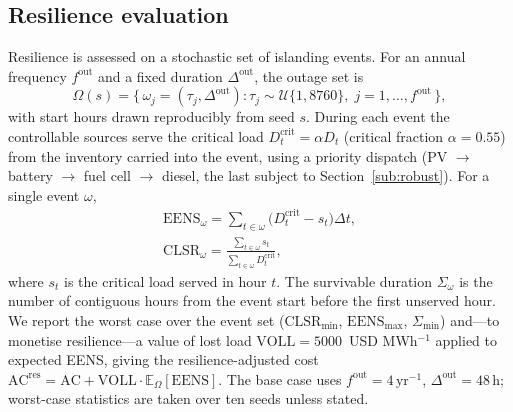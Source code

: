 \documentclass[preprint,12pt]{elsarticle}
\begin{document}
\subsection{Resilience evaluation}
\label{sub:resil}
Resilience is assessed on a stochastic set of islanding events. For an annual
frequency $f^{\mathrm{out}}$ and a fixed duration $\Delta^{\mathrm{out}}$, the
outage set is
\begin{equation}
\label{eq:omega}
\Omega(s) = \big\{\,\omega_j = (\tau_j,\Delta^{\mathrm{out}}) : \tau_j \sim \mathcal{U}\{1,8760\},\; j=1,\dots,f^{\mathrm{out}} \,\big\},
\end{equation}
with start hours drawn reproducibly from seed $s$. During each event the
controllable sources serve the critical load $D^{\mathrm{crit}}_t = \alpha D_t$
(critical fraction $\alpha=0.55$) from the inventory carried into the event, using
a priority dispatch (PV $\rightarrow$ battery $\rightarrow$ fuel cell $\rightarrow$
diesel, the last subject to Section~\ref{sub:robust}). For a single event $\omega$,
\begin{equation}
\label{eq:eens}
\begin{gathered}
\mathrm{EENS}_\omega = \!\!\sum_{t\in\omega}\!\big(D^{\mathrm{crit}}_t - s_t\big)\Delta t, \\[2pt]
\mathrm{CLSR}_\omega = \frac{\sum_{t\in\omega} s_t}{\sum_{t\in\omega} D^{\mathrm{crit}}_t},
\end{gathered}
\end{equation}
where $s_t$ is the critical load served in hour $t$. The survivable duration
$\Sigma_\omega$ is the number of contiguous hours from the event start before the
first unserved hour. We report the worst case over the event set
($\mathrm{CLSR}_{\min}$, $\mathrm{EENS}_{\max}$, $\Sigma_{\min}$) and---to monetise
resilience---a value of lost load $\mathrm{VOLL}=5000$~USD MWh$^{-1}$ applied to
expected EENS, giving the resilience-adjusted cost
$\mathrm{AC}^{\mathrm{res}} = \mathrm{AC} + \mathrm{VOLL}\cdot\mathbb{E}_\Omega[\mathrm{EENS}]$.
The base case uses $f^{\mathrm{out}}=4\,\mathrm{yr^{-1}}$,
$\Delta^{\mathrm{out}}=48\,\mathrm{h}$; worst-case statistics are taken over ten
seeds unless stated.
\end{document}
